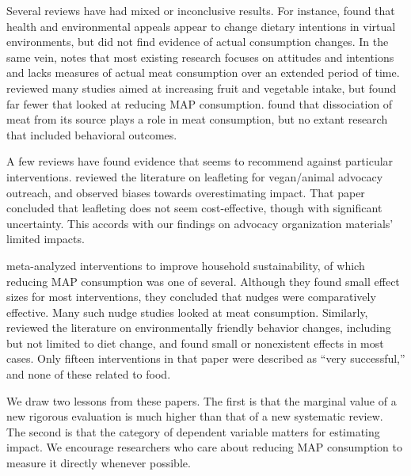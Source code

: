 \documentclass[sn-nature,referee,pdflatex]{sn-jnl}
\begin{document}
Several reviews have had mixed or inconclusive results. For instance,
\citep{bianchi2018conscious} found that health and environmental appeals
appear to change dietary intentions in virtual environments, but did not
find evidence of actual consumption changes. In the same vein,
\citep{kwasny2022} notes that most existing research focuses on
attitudes and intentions and lacks measures of actual meat consumption
over an extended period of time. \citep{taufik2019} reviewed many
studies aimed at increasing fruit and vegetable intake, but found far
fewer that looked at reducing MAP consumption. \citep{benningstad2020}
found that dissociation of meat from its source plays a role in meat
consumption, but no extant research that included behavioral outcomes.

A few reviews have found evidence that seems to recommend against
particular interventions. \citep{greig2017} reviewed the literature on
leafleting for vegan/animal advocacy outreach, and observed biases
towards overestimating impact. That paper concluded that leafleting does
not seem cost-effective, though with significant uncertainty. This
accords with our findings on advocacy organization materials' limited
impacts.

\citep{nisa2019} meta-analyzed interventions to improve household
sustainability, of which reducing MAP consumption was one of several.
Although they found small effect sizes for most interventions, they
concluded that nudges were comparatively effective. Many such nudge
studies looked at meat consumption. Similarly, \citep{rau2022} reviewed
the literature on environmentally friendly behavior changes, including
but not limited to diet change, and found small or nonexistent effects
in most cases. Only fifteen interventions in that paper were described
as ``very successful,'' and none of these related to food.

We draw two lessons from these papers. The first is that the marginal
value of a new rigorous evaluation is much higher than that of a new
systematic review. The second is that the category of dependent variable
matters for estimating impact. We encourage researchers who care about
reducing MAP consumption to measure it directly whenever possible.

\begin{comment}
First I feel a little strange saying that the marginal value of a review is low (then whay are we writing this paper?) Second, maybe there's a space for discussion about what counts as  meaningful? mention that ease of implementation matters in terms of what’s meaningful. The costs of fully exposing one person is the relevant denominator. The costs of recruitment are part of the cost. Maybe some people are more amenable to nudges after hearing an argument for
\end{comment}

\newpage

\renewcommand\refname{References}

\end{document}
